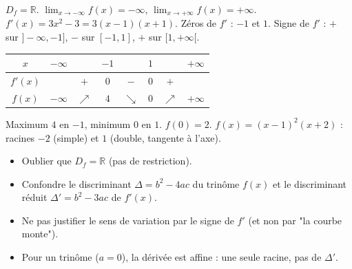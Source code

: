 \documentclass[11pt]{article}
\newcommand{\legende}[1]{\par\vspace{6pt}{\popsemi\fontsize{9}{11.5}\selectfont\color{popmuted}#1}}
\begin{document}
\begin{exemplebox}[Étude de $f(x) = x^3 - 3x + 2$]
$D_f = \mathbb{R}$.
$\lim_{x\to-\infty} f(x) = -\infty$, $\lim_{x\to+\infty} f(x) = +\infty$.
$f'(x) = 3x^2 - 3 = 3(x-1)(x+1)$.
Zéros de $f'$ : $-1$ et $1$.
Signe de $f'$ : $+$ sur $]-\infty, -1]$, $-$ sur $[-1, 1]$, $+$ sur $[1, +\infty[$.
\begin{center}
\begin{tabular}{|c|ccccccc|}\hline
$x$ & $-\infty$ & & $-1$ & & $1$ & & $+\infty$ \\ \hline
$f'(x)$ & & $+$ & $0$ & $-$ & $0$ & $+$ & \\ \hline
$f(x)$ & $-\infty$ & $\nearrow$ & $4$ & $\searrow$ & $0$ & $\nearrow$ & $+\infty$ \\ \hline
\end{tabular}
\end{center}
Maximum $4$ en $-1$, minimum $0$ en $1$.
$f(0)=2$. $f(x)=(x-1)^2(x+2)$ : racines $-2$ (simple) et $1$ (double, tangente à l'axe).
\tcblower
\begin{popfigure}
\legende{Courbe de $f(x)=x^3-3x+2$.}
\end{popfigure}
\end{exemplebox}

\begin{attention}
\begin{itemize}
  \item Oublier que $D_f = \mathbb{R}$ (pas de restriction).
  \item Confondre le discriminant $\Delta = b^2-4ac$ du trinôme $f(x)$ et le discriminant réduit $\Delta' = b^2-3ac$ de $f'(x)$.
  \item Ne pas justifier le sens de variation par le signe de $f'$ (et non par "la courbe monte").
  \item Pour un trinôme ($a=0$), la dérivée est affine : une seule racine, pas de $\Delta'$.
\end{itemize}
\end{attention}
\end{document}

